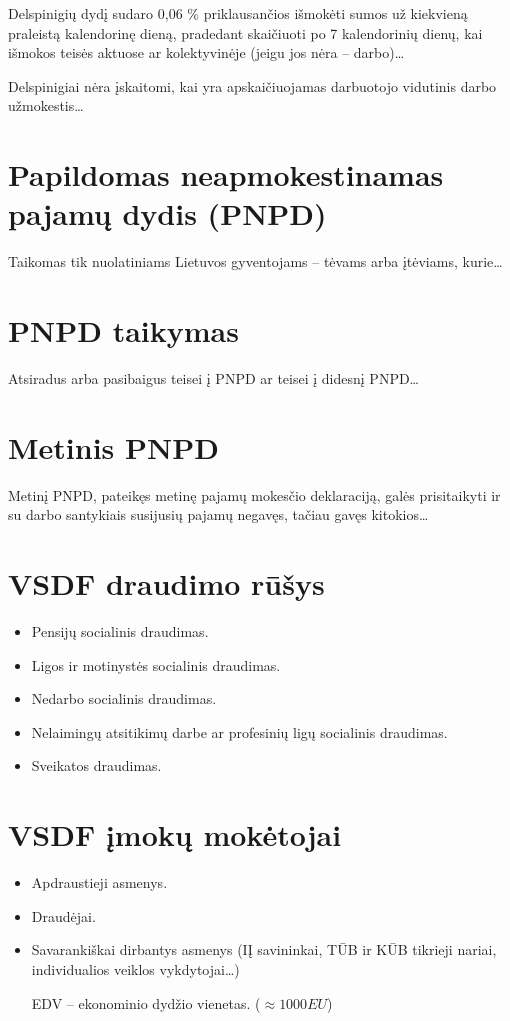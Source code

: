 Delspinigių dydį sudaro 0,06 \% priklausančios išmokėti sumos už
kiekvieną praleistą kalendorinę dieną, pradedant skaičiuoti po
7 kalendorinių dienų, kai išmokos teisės aktuose ar kolektyvinėje
(jeigu jos nėra – darbo)…

Delspinigiai nėra įskaitomi, kai yra apskaičiuojamas darbuotojo vidutinis
darbo užmokestis…

\section{Papildomas neapmokestinamas pajamų dydis (PNPD)}

Taikomas tik nuolatiniams Lietuvos gyventojams – tėvams arba įtėviams,
kurie…

\section{PNPD taikymas}

Atsiradus arba pasibaigus teisei į PNPD ar teisei į didesnį
PNPD…

\section{Metinis PNPD}

Metinį PNPD, pateikęs metinę pajamų mokesčio deklaraciją, galės
prisitaikyti ir su darbo santykiais susijusių pajamų negavęs, tačiau
gavęs kitokios…

\section{VSDF draudimo rūšys}

\begin{itemize}
  \item Pensijų socialinis draudimas.
  \item Ligos ir motinystės socialinis draudimas.
  \item Nedarbo socialinis draudimas.
  \item Nelaimingų atsitikimų darbe ar profesinių ligų socialinis draudimas.
  \item Sveikatos draudimas.
\end{itemize}

\section{VSDF įmokų mokėtojai}

\begin{itemize}
  \item Apdraustieji asmenys.
  \item Draudėjai.
  \item Savarankiškai dirbantys asmenys (IĮ savininkai, TŪB ir KŪB
    tikrieji nariai, individualios veiklos vykdytojai…)

    EDV – ekonominio dydžio vienetas. ($\approx 1000 EU$)
\end{itemize}

